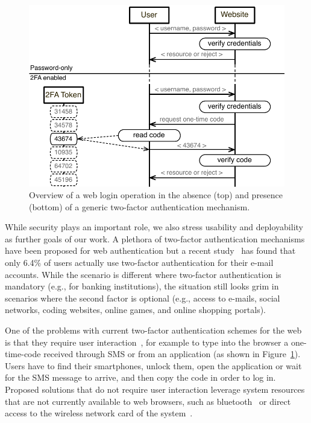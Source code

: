 \begin{figure}[!ht]
    \centering
    \includegraphics[width=.9\linewidth]{figures/phonesecures/intro_2fa}
    \caption[Web login without 2FA and with 2FA enabled]{Overview of a web login operation in the absence (top) and presence (bottom) of a generic two-factor authentication mechanism.}
    \label{fig:2fa}
\end{figure}

While security plays an important role, we also stress usability and deployability as further goals of our work. A plethora of two-factor authentication mechanisms have been proposed for web authentication but a recent study~\cite{petsas15eurosec} has found that only 6.4\% of users actually use two-factor authentication for their e-mail accounts. While the scenario is different where two-factor authentication is mandatory (e.g., for banking institutions), the situation still looks grim in scenarios where the second factor is optional (e.g., access to e-mails, social networks, coding websites, online games, and online shopping portals).

One of the problems with current two-factor authentication schemes for the web is that they require user interaction~\cite{google_authentication,yubico,authy,encap}, for example to type into the browser a one-time-code received through SMS or from an application (as shown in Figure~\ref{fig:2fa}). Users have to find their smartphones, unlock them, open the application or wait for the SMS message to arrive, and then copy the code in order to log in. Proposed solutions that do not require user interaction leverage system resources that are not currently available to web browsers, such as bluetooth~\cite{czeskis12ccs} or direct access to the wireless network card of the system~\cite{shirvanian14}.

